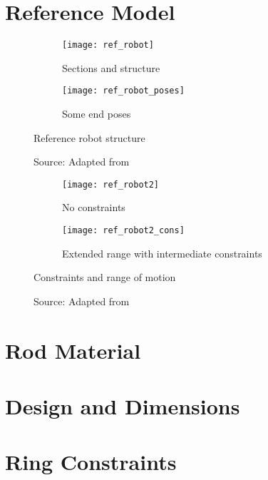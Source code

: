 \blindtext

\section{Reference Model}

\begin{figure}
    \centering
    \begin{subfigure}[t]{0.3\textwidth}
        \texttt{[image: ref\_robot]}
        \caption{Sections and structure}
        \label{fig:ref_robot_structure}
    \end{subfigure}
    \begin{subfigure}[t]{0.3\textwidth}
        \texttt{[image: ref\_robot\_poses]}
        \caption{Some end poses}
        \label{fig:ref_robot_poses}
    \end{subfigure}
    \caption{Reference robot structure}
    \caption*{Source: Adapted from \cite{wu2022}}
    \label{fig:ref_robot}
\end{figure}

\blindtext

\begin{figure}
    \centering
    \begin{subfigure}[t]{0.257\textwidth}
        \texttt{[image: ref\_robot2]}
        \caption{No constraints}
        \label{fig:ref_robot2}
    \end{subfigure}
    \begin{subfigure}[t]{0.643\textwidth}
        \texttt{[image: ref\_robot2\_cons]}
        \caption{Extended range with intermediate constraints}
        \label{fig:ref_robot2_cons}
    \end{subfigure}
    \caption{Constraints and range of motion}
    \caption*{Source: Adapted from \cite{orekhov2017}}
    \label{fig:ref_robot2_constraints}
\end{figure}

\section{Rod Material}

\par [Rod definition]
\par [Table of materials]
\par [Table of properties of steel material]

\blindtext

\section{Design and Dimensions}

\blindtext

\section{Ring Constraints}

\blindtext
